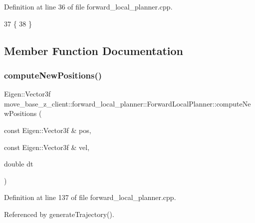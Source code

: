 Definition at line 36 of file forward\+\_\+local\+\_\+planner.\+cpp.


\begin{DoxyCode}
37 \{
38 \}
\end{DoxyCode}


\subsection{Member Function Documentation}
\mbox{\label{classmove__base__z__client_1_1forward__local__planner_1_1ForwardLocalPlanner_a1065c0e507dbea9cef4f0c2c6118eafb}} 
\subsubsection{\texorpdfstring{compute\+New\+Positions()}{computeNewPositions()}}
{\footnotesize\ttfamily Eigen\+::\+Vector3f move\+\_\+base\+\_\+z\+\_\+client\+::forward\+\_\+local\+\_\+planner\+::\+Forward\+Local\+Planner\+::compute\+New\+Positions (\begin{DoxyParamCaption}\item[{const Eigen\+::\+Vector3f \&}]{pos,  }\item[{const Eigen\+::\+Vector3f \&}]{vel,  }\item[{double}]{dt }\end{DoxyParamCaption})\hspace{0.3cm}{\ttfamily [private]}}



Definition at line 137 of file forward\+\_\+local\+\_\+planner.\+cpp.



Referenced by generate\+Trajectory().


